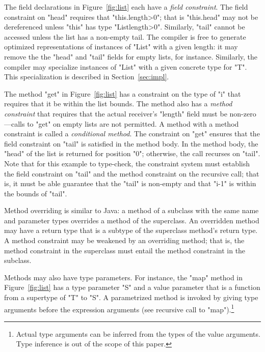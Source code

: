 The field  declarations in Figure~\ref{fig:list}
each have a \emph{field constraint}.  The field constraint on
\xcd"head" requires that \xcd"this.length>0";
that is \xcd"this.head" may not be dereferenced
unless \xcd"this" has type \xcd"List{length>0}".  Similarly,
\xcd"tail" cannot be accessed unless the list has a non-empty tail.  The
compiler is free to generate optimized representations of
instances of \xcd"List" with a given length: it may remove the
the \xcd"head" and \xcd"tail" fields for empty lists, for
instance.  Similarly, the compiler may specialize instances of
\xcd"List" with a given concrete type for \xcd"T".  This
specialization is described in Section~\ref{sec:impl}.

The method \xcd"get" in Figure~\ref{fig:list}
has a constraint on the type of \xcd"i" that requires
that it be within the list bounds.
The method also has a \emph{method constraint} that
requires that the actual
receiver's
\xcd"length" field must be non-zero---calls to \xcd"get" on empty lists are not
permitted.
A method with a method constraint is called a \emph{conditional method}.
The constraint on \xcd"get" ensures that the field constraint on
\xcd"tail" is satisfied in the method body.
In the method body, the \xcd"head" of the list is returned for
position \xcd"0"; otherwise, the call recurses on \xcd"tail".
Note that for this example to type-check, the constraint system
must establish the field constraint on \xcd"tail"
and the method constraint on the recursive call;
that is, it must be able
guarantee that the \xcd"tail" is non-empty and that
\xcd"i-1" is within the bounds of \xcd"tail".

Method overriding is similar to Java: a method of a subclass
with the same name and parameter types overrides a method of the
superclass.  An overridden method may have a return type that is
a subtype of the superclass method's return type.
A method constraint may be weakened by an overriding
method; that is, the method constraint in the superclass must entail the  
method constraint in the subclass.

Methods may also have type parameters.  
For instance, the \xcd"map" method in Figure~\ref{fig:list} 
has a type parameter \xcd"S" and a value parameter that is a
function from a supertype of \xcd"T" to \xcd"S".
A parametrized method is invoked by giving type arguments before the
expression arguments (see recursive call to
\xcd"map").\footnote{Actual type arguments can be inferred from the types
of the value arguments. Type inference is out of the scope of this paper.}

